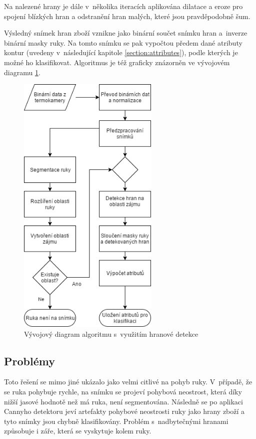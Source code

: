 Na nalezené hrany je dále v~několika iteracích aplikována dilatace a eroze pro spojení blízkých hran a odstranění hran malých, které jsou pravděpodobně šum. 

Výsledný snímek hran zboží vznikne jako binární součet snímku hran a~inverze binární masky ruky. Na tomto snímku se pak vypočtou předem dané atributy kontur (uvedeny v~následující kapitole \ref{section:attributes}), podle kterých je možné ho klasifikovat. Algoritmus je též graficky znázorněn ve vývojovém diagramu \ref{fig:edge_detection_diagram}.

\begin{figure}[h]
  \centering
  \includegraphics[width=0.6\textwidth]{images/edge_detection_diagram.png}
  \caption{Vývojový diagram algoritmu s~využitím hranové detekce}
  \label{fig:edge_detection_diagram}
\end{figure} 

    \subsection{Problémy}
    Toto řešení se mimo jiné ukázalo jako velmi citlivé na pohyb ruky. V~případě, že se ruka pohybuje rychle, na snímku se projeví pohybová neostrost, která díky nižší jasové hodnotě než má ruka, není segmentována. Následně se po aplikaci Cannyho detektoru jeví artefakty pohybové neostrosti ruky jako hrany zboží a tyto snímky jsou chybně klasifikovány. Problém s~nadbytečnými hranami způsobuje i záře, která se vyskytuje kolem ruky.

